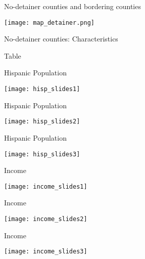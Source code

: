 \documentclass[xcolor=pdftex,dvipsnames,table]{beamer}
\begin{document}
\begin{frame}{No-detainer counties and bordering counties}
\begin{center}
\texttt{[image: map\_detainer.png]}
\end{center}
\end{frame}

\begin{frame}{No-detainer counties: Characteristics}
\begin{center}
Table
\end{center}
\end{frame}

\begin{frame}{Hispanic Population}
\begin{center}
\texttt{[image: hisp\_slides1]}
\end{center}
\end{frame}

\begin{frame}{Hispanic Population}
\begin{center}
\texttt{[image: hisp\_slides2]}
\end{center}
\end{frame}

\begin{frame}{Hispanic Population}
\begin{center}
\texttt{[image: hisp\_slides3]}
\end{center}
\end{frame}

\begin{frame}{Income}
\begin{center}
\texttt{[image: income\_slides1]}
\end{center}
\end{frame}

\begin{frame}{Income}
\begin{center}
\texttt{[image: income\_slides2]}
\end{center}
\end{frame}

\begin{frame}{Income}
\begin{center}
\texttt{[image: income\_slides3]}
\end{center}
\end{frame}
\end{document}
